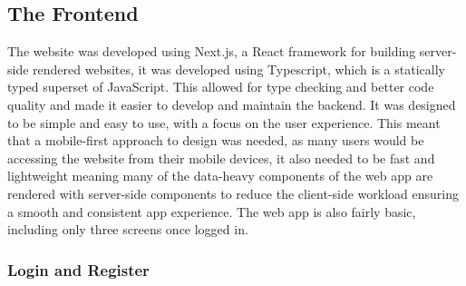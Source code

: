 \subsection{The Frontend}
The website was developed using Next.js, a React framework for building server-side rendered websites, it was developed using Typescript, which is a statically typed superset of JavaScript. This allowed for type checking and better code quality and made it easier to develop and maintain the backend. It was designed to be simple and easy to use, with a focus on the user experience. This meant that a mobile-first approach to design was needed, as many users would be accessing the website from their mobile devices, it also needed to be fast and lightweight meaning many of the data-heavy components of the web app are rendered with server-side components to reduce the client-side workload ensuring a smooth and consistent app experience. The web app is also fairly basic, including only three screens once logged in.
\subsubsection{Login and Register}

